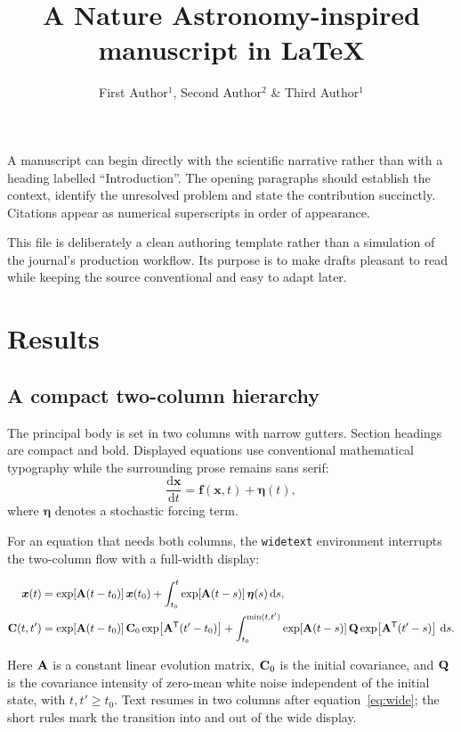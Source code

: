 \documentclass[10pt,a4paper,twocolumn]{article}
\title{A Nature Astronomy-inspired manuscript in \LaTeX}
\author{First Author$^{1}$, Second Author$^{2}$ \& Third Author$^{1}$}
\begin{document}
\maketitle

A manuscript can begin directly with the scientific narrative rather than with a heading labelled ``Introduction''. The opening paragraphs should establish the context, identify the unresolved problem and state the contribution succinctly. Citations appear as numerical superscripts in order of appearance.\cite{einstein1916,shakura1973}

This file is deliberately a clean authoring template rather than a simulation of the journal's production workflow. Its purpose is to make drafts pleasant to read while keeping the source conventional and easy to adapt later.

\section{Results}
\subsection{A compact two-column hierarchy}
The principal body is set in two columns with narrow gutters. Section headings are compact and bold. Displayed equations use conventional mathematical typography while the surrounding prose remains sans serif:
\begin{equation}
  \frac{\mathrm{d}\boldsymbol{x}}{\mathrm{d}t}
  = \boldsymbol{f}(\boldsymbol{x},t) + \boldsymbol{\eta}(t),
\end{equation}
where $\boldsymbol{\eta}$ denotes a stochastic forcing term.

For an equation that needs both columns, the \texttt{widetext} environment
interrupts the two-column flow with a full-width display:
\begin{widetext}
  \begin{equation}
    \label{eq:wide}
    \begin{aligned}
      \bm{x}(t)
      &= \exp\!\left[\mathbf{A}(t-t_0)\right]\bm{x}(t_0)
      + \int_{t_0}^{t}\exp\!\left[\mathbf{A}(t-s)\right]\bm{\eta}(s)\,\mathrm{d}s,\\
      \mathbf{C}(t,t')
      &= \exp\!\left[\mathbf{A}(t-t_0)\right]\mathbf{C}_0
      \exp\!\left[\mathbf{A}^{\mathsf{T}}(t'-t_0)\right]
      + \int_{t_0}^{\min(t,t')}\exp\!\left[\mathbf{A}(t-s)\right]
      \mathbf{Q}\exp\!\left[\mathbf{A}^{\mathsf{T}}(t'-s)\right]\,\mathrm{d}s.
    \end{aligned}
  \end{equation}
\end{widetext}
Here $\mathbf{A}$ is a constant linear evolution matrix, $\mathbf{C}_0$ is the
initial covariance, and $\mathbf{Q}$ is the covariance intensity of zero-mean
white noise independent of the initial state, with $t,t'\geq t_0$.
Text resumes in two columns after equation~\ref{eq:wide}; the short rules
mark the transition into and out of the wide display.
\end{document}
